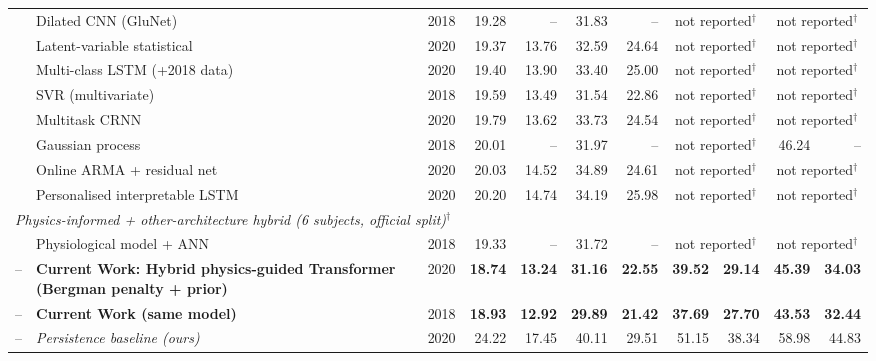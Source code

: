 \documentclass[journal]{IEEEtran}
\begin{document}
\begin{table}[t]
{\begin{tabular}{l>{\raggedright\arraybackslash}p{2.6cm}crrrrrrrr}
\cite{ref81} & Dilated CNN (GluNet) & 2018 & 19.28 & -- & 31.83 & -- & \multicolumn{2}{c}{not reported$^{\dagger}$} & \multicolumn{2}{c}{not reported$^{\dagger}$} \\
\cite{ref68} & Latent-variable statistical & 2020 & 19.37 & 13.76 & 32.59 & 24.64 & \multicolumn{2}{c}{not reported$^{\dagger}$} & \multicolumn{2}{c}{not reported$^{\dagger}$} \\
\cite{ref69} & Multi-class LSTM (+2018 data) & 2020 & 19.40 & 13.90 & 33.40 & 25.00 & \multicolumn{2}{c}{not reported$^{\dagger}$} & \multicolumn{2}{c}{not reported$^{\dagger}$} \\
\cite{ref82} & SVR (multivariate) & 2018 & 19.59 & 13.49 & 31.54 & 22.86 & \multicolumn{2}{c}{not reported$^{\dagger}$} & \multicolumn{2}{c}{not reported$^{\dagger}$} \\
\cite{ref71} & Multitask CRNN & 2020 & 19.79 & 13.62 & 33.73 & 24.54 & \multicolumn{2}{c}{not reported$^{\dagger}$} & \multicolumn{2}{c}{not reported$^{\dagger}$} \\
\cite{ref83} & Gaussian process & 2018 & 20.01 & -- & 31.97 & -- & \multicolumn{2}{c}{not reported$^{\dagger}$} & 46.24 & -- \\
\cite{ref72} & Online ARMA + residual net & 2020 & 20.03 & 14.52 & 34.89 & 24.61 & \multicolumn{2}{c}{not reported$^{\dagger}$} & \multicolumn{2}{c}{not reported$^{\dagger}$} \\
\cite{ref73} & Personalised interpretable LSTM & 2020 & 20.20 & 14.74 & 34.19 & 25.98 & \multicolumn{2}{c}{not reported$^{\dagger}$} & \multicolumn{2}{c}{not reported$^{\dagger}$} \\
\midrule
\multicolumn{11}{l}{\textit{Physics-informed + other-architecture hybrid (6 subjects, official split)$^{\dagger}$}} \\
\cite{ref58} & Physiological model + ANN & 2018 & 19.33 & -- & 31.72 & -- & \multicolumn{2}{c}{not reported$^{\dagger}$} & \multicolumn{2}{c}{not reported$^{\dagger}$} \\
\midrule
-- & \textbf{Current Work: Hybrid physics-guided Transformer (Bergman penalty + prior)} & 2020 & \textbf{18.74} & \textbf{13.24} & \textbf{31.16} & \textbf{22.55} & \textbf{39.52} & \textbf{29.14} & \textbf{45.39} & \textbf{34.03} \\
-- & \textbf{Current Work (same model)} & 2018 & \textbf{18.93} & \textbf{12.92} & \textbf{29.89} & \textbf{21.42} & \textbf{37.69} & \textbf{27.70} & \textbf{43.53} & \textbf{32.44} \\
-- & \emph{Persistence baseline (ours)} & 2020 & 24.22 & 17.45 & 40.11 & 29.51 & 51.15 & 38.34 & 58.98 & 44.83 \\

\end{tabular}}
\end{table}
\end{document}
